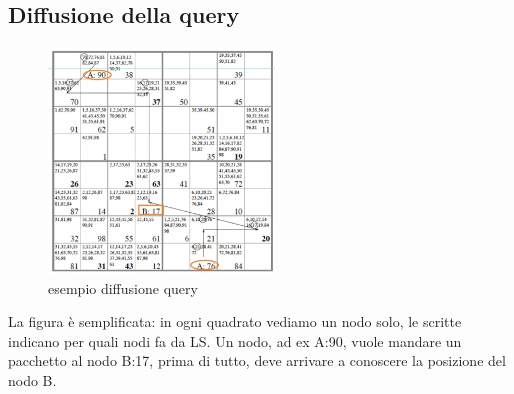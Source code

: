 \documentclass[12pt,italian]{report}
\begin{document}
\subsection{Diffusione della query}
\begin{figure}[h]
\centering
\includegraphics[width=60mm]{img/diffqueryls.PNG}
\caption{esempio diffusione query}
\label{fig:hhtrhrffrt}
\end{figure}
La figura è semplificata: in ogni quadrato vediamo un nodo solo, le scritte indicano per quali nodi fa da LS. 
\bigbreak
Un nodo, ad ex A:90, vuole mandare un pacchetto al nodo B:17, prima di tutto, deve arrivare a conoscere la posizione del nodo B.
\end{document}
